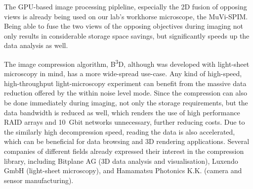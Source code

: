 \documentclass{booklet_style}
\def\b3d{B\textsuperscript{3}D}
\begin{document}
  The GPU-based image processing pipleline, especially the 2D fusion of opposing views is already being used on our lab's workhorse microscope, the MuVi-SPIM. Being able to fuse the two views of the opposing objectives during imaging not only results in considerable storage space savings, but significantly speeds up the data analysis as well.

  The image compression algorithm, \b3d, although was developed with light-sheet microscopy in mind, has a more wide-spread use-case. Any kind of high-speed, high-throughput light-microscopy experiment can benefit from the massive data reduction offered by the within noise level mode. Since the compression can also be done immediately during imaging, not only the storage requirements, but the data bandwidth is reduced as well, which renders the use of high performance RAID arrays and \SI{10}{Gbit} networks unnecessary, further reducing costs.
  Due to the similarly high decompression speed, reading the data is also accelerated, which can be beneficial for data browsing and 3D rendering applications. Several companies of different fields already expressed their interest in the compression library, including Bitplane AG (3D data analysis and visualisation), Luxendo GmbH (light-sheet microscopy), and Hamamatsu Photonics K.K. (camera and sensor manufacturing).







\end{document}
